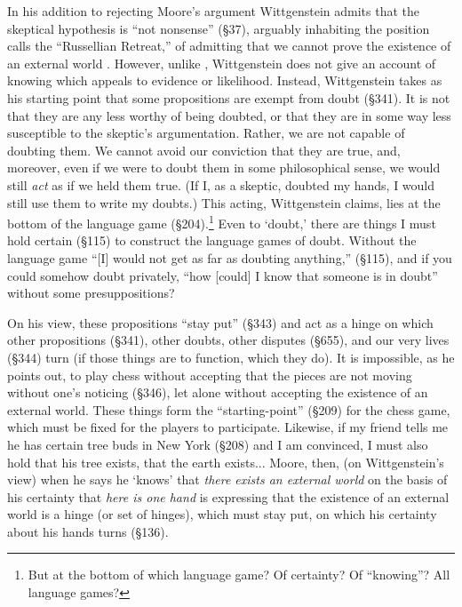 \documentclass[doc,12pt,apacite,biblatex]{apa6}
\begin{document}


In his addition to rejecting Moore's argument Wittgenstein admits that the
skeptical hypothesis is ``not nonsense'' (\S 37), arguably inhabiting the
position  calls the ``Russellian Retreat,'' of admitting that
we cannot prove the existence of an external world \cite{Robinson}.  However,
unlike , Wittgenstein does not give an account of knowing
which appeals to evidence or likelihood.  Instead, Wittgenstein takes as his
starting point that some propositions are exempt from doubt (\S 341). It is not
that they are any less worthy of being doubted, or that they are in some way
less susceptible to the skeptic's argumentation. Rather, we are not capable of
doubting them. We cannot avoid our conviction that they are true, and,
moreover, even if we were to doubt them in some philosophical sense, we would
still \emph{act} as if we held them true.  (If I, as a skeptic, doubted my
hands, I would still use them to write my doubts.) This acting, Wittgenstein
claims, lies at the bottom of the language game (\S 204).\footnote{But at the
bottom of which language game? Of certainty?  Of ``knowing''? All language
games?}
Even to `doubt,' there are things I must hold certain (\S 115) to construct the
language games of doubt. Without the language game ``[I] would not get as far
as doubting anything,'' (\S 115), and if you could somehow doubt privately,
``how [could] I know that someone is in doubt'' without some presuppositions?

On his view, these propositions ``stay put'' (\S 343) and act as a hinge on
which other propositions (\S 341), other doubts, other disputes (\S 655), and
our very lives (\S 344) turn (if those things are to function, which they do).
It is impossible, as he points out, to play chess without accepting that the
pieces are not moving without one's noticing (\S 346), let alone without
accepting the existence of an external world. These things form the
``starting-point'' (\S 209) for the chess game, which must be fixed for the
players to participate. Likewise, if my friend tells me he has certain tree
buds in New York (\S 208) and I am convinced, I must also hold that his tree
exists, that the earth exists...
Moore, then, (on Wittgenstein's view) when he says he `knows' that \emph{there
exists an external world} on the basis of his certainty that \emph{here is one
hand} is expressing that the existence of an external world is a hinge (or set
of hinges), which must stay put, on which his certainty about his hands turns
(\S 136).
\end{document}
